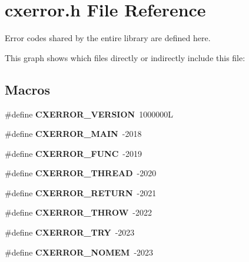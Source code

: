 \hypertarget{a00008}{}\section{cxerror.\+h File Reference}
\label{a00008}


Error codes shared by the entire library are defined here.  


This graph shows which files directly or indirectly include this file\+:
\subsection*{Macros}
\begin{DoxyCompactItemize}
\item 
\mbox{\label{a00008_a5b8d52f060c8908fb025bd16201fbf49}} 
\#define {\bfseries C\+X\+E\+R\+R\+O\+R\+\_\+\+V\+E\+R\+S\+I\+ON}~1000000L
\item 
\mbox{\label{a00008_ab600a2597512889da741a03cab3797e8}} 
\#define {\bfseries C\+X\+E\+R\+R\+O\+R\+\_\+\+M\+A\+IN}~-\/2018
\item 
\mbox{\label{a00008_ad036caf4caff7b0dc9d41887337646f2}} 
\#define {\bfseries C\+X\+E\+R\+R\+O\+R\+\_\+\+F\+U\+NC}~-\/2019
\item 
\mbox{\label{a00008_a35bddeba7e57335e72010a3bfd324a71}} 
\#define {\bfseries C\+X\+E\+R\+R\+O\+R\+\_\+\+T\+H\+R\+E\+AD}~-\/2020
\item 
\mbox{\label{a00008_ae6621b332130a649e1e1684b3e1082f3}} 
\#define {\bfseries C\+X\+E\+R\+R\+O\+R\+\_\+\+R\+E\+T\+U\+RN}~-\/2021
\item 
\mbox{\label{a00008_a1ec6bc7be0b7c5985f97540d00c84de2}} 
\#define {\bfseries C\+X\+E\+R\+R\+O\+R\+\_\+\+T\+H\+R\+OW}~-\/2022
\item 
\mbox{\label{a00008_a67aba3619760b88b100127a53a41cc16}} 
\#define {\bfseries C\+X\+E\+R\+R\+O\+R\+\_\+\+T\+RY}~-\/2023
\item 
\mbox{\label{a00008_a3c7905fc6441e714dbf9c9ad464a59c7}} 
\#define {\bfseries C\+X\+E\+R\+R\+O\+R\+\_\+\+N\+O\+M\+EM}~-\/2023
\item 
\mbox{\label{a00008_ad20217630427985309eaaa7e5db79af6}} 

\end{DoxyCompactItemize}
